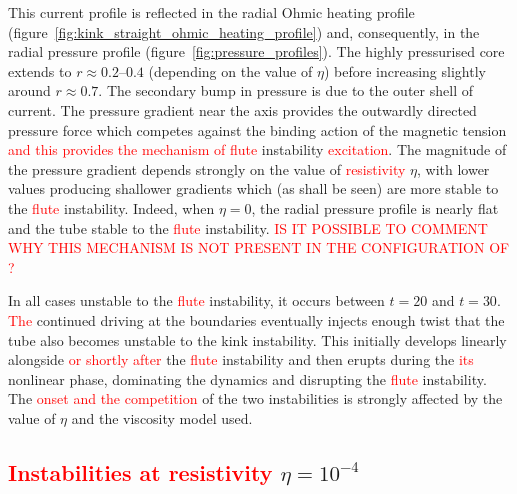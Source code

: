 \documentclass[12pt]{article}
\newcommand{\rs}[2]{\textcolor{red}{#2}}
\begin{document}
This current profile is reflected in the radial Ohmic heating profile
(figure~\ref{fig:kink_straight_ohmic_heating_profile}) and,
consequently, in the radial pressure profile
(figure~\ref{fig:pressure_profiles}). The highly pressurised core
extends to $r\approx 0.2$--$0.4$ (depending on the value of $\eta$)
before increasing slightly around $r\approx 0.7$. The secondary bump
in pressure is due to the outer shell of current. The pressure
gradient near the axis provides the outwardly directed pressure force
which competes against the binding action of the magnetic tension
\rs{to (potentially) result in the}{and this provides the mechanism of}
\rs{fluting}{flute} instability \rs{}{excitation}.  The magnitude
of the pressure gradient depends strongly on the value of
\rs{}{resistivity} $\eta$, with lower values producing shallower 
gradients which (as shall be seen) are more stable to the
\rs{fluting}{flute} instability. Indeed, when $\eta=0$, the radial
pressure profile is nearly flat and the tube stable to the
\rs{fluting}{flute} instability. \rs{}{IS IT POSSIBLE TO COMMENT WHY
  THIS MECHANISM IS NOT PRESENT IN THE CONFIGURATION OF \cite{quinnEffectAnisotropicViscosity2020a}?}

In all cases unstable to the \rs{fluting}{flute} instability, it
occurs \rs{some time}{} between $t=20$ and $t=30$. \rs{During this
  time, the}{The} continued driving at the boundaries eventually
injects enough twist that the tube also becomes unstable to the kink
instability. This initially develops linearly alongside \rs{}{or shortly
after} the \rs{fluting}{flute} instability and then erupts during the
\rs{kink's}{its}  nonlinear phase, dominating the dynamics and
disrupting the   \rs{fluting}{flute} instability. The \rs{}{onset and
the competition} of the two instabilities is strongly affected by
the value of $\eta$ and the viscosity model used. 

\subsection{\rs{Development where}{Instabilities at resistivity} $\eta=10^{-4}$}
\end{document}
